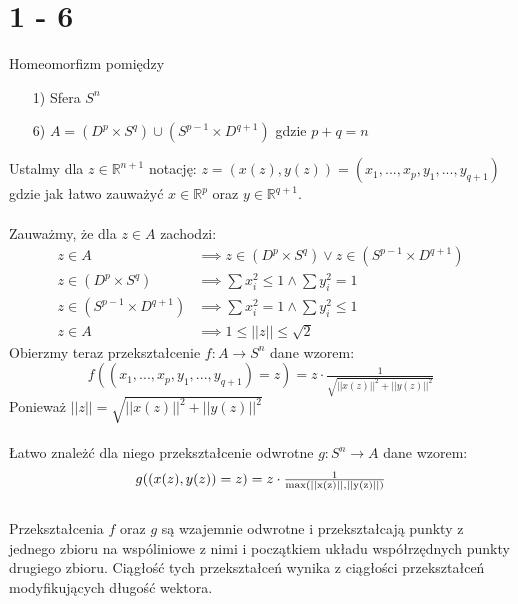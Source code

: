 \newpage
\section*{1 - 6}
Homeomorfizm pomiędzy
\begin{itemize}
  \item[1)] Sfera $S^n$
  \item[6)] $A = (D^p \times S^q) \cup (S^{p-1} \times D^{q+1})$ gdzie $p+q = n$
\end{itemize}
Ustalmy dla $ z \in \mathbb{R}^{n+1}$ notację: $  z = (x(z), y(z)) = (x_1, ..., x_p, y_1, ..., y_{q+1}) $ gdzie jak łatwo zauważyć $x \in \mathbb{R}^p$ oraz $y \in \mathbb{R}^{q+1} $. \\
\\
Zauważmy, że dla $z \in A$ zachodzi:
\begin{align*}
  z \in A & \implies z \in (D^p \times S^q) \lor z \in (S^{p-1} \times D^{q+1}) \\
  z \in (D^p \times S^q) & \implies \sum x_i^2 \leq 1 \land \sum y_i^2 = 1 \\
  z \in (S^{p-1} \times D^{q+1}) & \implies \sum x_i^2 = 1 \land \sum y_i^2 \leq 1 \\
  z \in A & \implies 1 \leq ||z|| \leq \sqrt{2}
\end{align*}
Obierzmy teraz przekształcenie $ f : A \to S^n $ dane wzorem:
\begin{equation*}
  f((x_1, ..., x_p, y_1, ..., y_{q+1}) = z) = z \cdot \tfrac{1}{\sqrt{||x(z)||^2 + ||y(z)||^2}}
\end{equation*}
Ponieważ $ ||z|| = \sqrt{||x(z)||^2 + ||y(z)||^2} $\\
\\
Łatwo znależć dla niego przekształcenie odwrotne $ g : S^n \to A $ dane wzorem:
\begin{equation*}
  g((x(z), y(z)) = z) = z \cdot \tfrac{1}{\rm max(||x(z)||, ||y(z)||)}
\end{equation*}
\\
Przekształcenia $f$ oraz $g$ są wzajemnie odwrotne i przekształcają punkty z jednego zbioru na wspóliniowe z nimi i początkiem układu współrzędnych punkty drugiego zbioru. Ciągłość tych przekształceń wynika z ciągłości przekształceń modyfikujących długość wektora.
